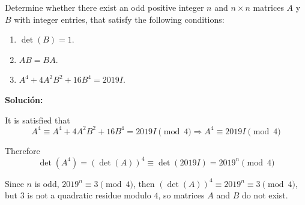 \documentclass[../../main.tex]{subfiles}
\begin{document}
  \begin{shaded}
    Determine whether there exist an odd positive integer $n$ and $n \times n$ matrices $A$ y $B$ with integer entries, that satisfy the following conditions:

    \begin{enumerate}[1.]
      \item $\det{(B)} = 1$.
      \item $A B = B A$.
      \item $A^4 + 4 A^2 B^2 + 16 B^4 = 2019 I$.
    \end{enumerate}
  \end{shaded}

  \textbf{Solución:}

  It is satisfied that
  $$
  A^4 \equiv A^4 + 4 A^2 B^2 + 16 B^4 = 2019 I \pmod{4} \Longrightarrow A^4 \equiv 2019 I \pmod{4}
  $$

  Therefore
  $$
  \det{(A^4)} = \left(\det{(A)}\right)^4 \equiv \det{(2019 I)} = 2019^n \pmod{4}
  $$

  Since $n$ is odd, $2019^n \equiv 3 \pmod{4}$, then $\left(\det{(A)}\right)^4 \equiv  2019^n \equiv 3 \pmod{4}$, but $3$ is not a quadratic residue modulo $4$, so matrices $A$ and $B$ do not exist.
\end{document}
